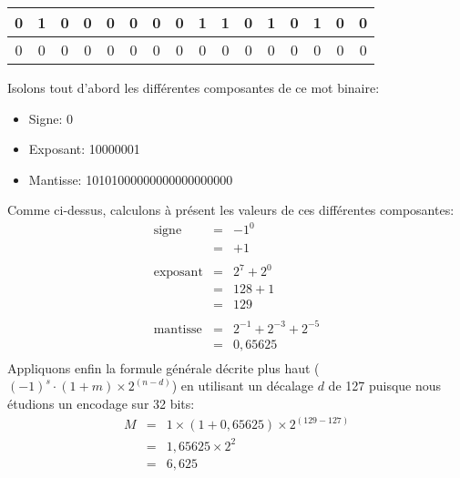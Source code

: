 \documentclass[12pt]{article}
\begin{document}
	\begin{MaReponse}
		\begin{alphenum}
			\item
			\begin{tabular}{|c|c|c|c|c|c|c|c|c|c|c|c|c|c|c|c|} %
				\hline
				0&1&0&0&0&0&0&0&1&1&0&1&0&1&0&0 \\
				\hline
				0&0&0&0&0&0&0&0&0&0&0&0&0&0&0&0 \\
				\hline
			\end{tabular}
			\par
			Isolons tout d'abord les différentes composantes de ce mot binaire:
			\begin{itemize}
				\item Signe: 0
				\item Exposant: 10000001
				\item Mantisse: 10101000000000000000000
			\end{itemize}
			Comme ci-dessus, calculons à présent les valeurs de ces différentes composantes:
			\[
			\begin{array}{lll}
				\text{signe} & \text{=} & -1^0\\
				& \text{=} & +1\\
				\\
				\text{exposant} & \text{=} & 2^7 + 2^0\\
				& \text{=} & 128 + 1\\
				& \text{=} & 129\\
				\\
				\text{mantisse} & \text{=} & 2^{-1} + 2^{-3} + 2^{-5}\\
				& \text{=} & 0,65625\\
			\end{array}
			\]
			Appliquons enfin la formule générale décrite plus haut ($(-1)^s\cdot (1+m) \times 2^{(n-d)}$) en utilisant un décalage $d$ de 127 puisque nous étudions un encodage sur 32 bits:
			\[
			\begin{array}{lll}
				M& \text{=} & 1 \times (1+0,65625) \times 2^{(129 - 127)}\\
				& \text{=} & 1,65625 \times 2^2\\
				& \text{=} & 6,625\
			\end{array}
			\]
			

\end{alphenum}
\end{MaReponse}
\end{document}
